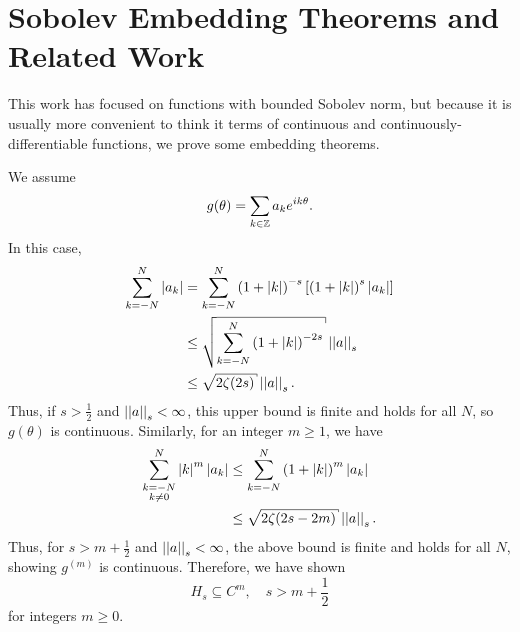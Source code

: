 \section{Sobolev Embedding Theorems and Related Work}
\label{sec:cvip_sobolev}

This work has focused on functions with bounded
Sobolev norm, but because it is usually more convenient
to think it terms of continuous
and continuously-differentiable functions, we prove some embedding theorems.

We assume
%
\begin{equation}
    g(\theta) = \sum_{k\in\mathbb{Z}} a_{k}e^{ik\theta}.
\end{equation}
%
In this case,
%
\begin{align}
    \sum_{k=-N}^{N} \abs{a_{k}}
        &= \sum_{k=-N}^{N} \parens{1+\abs{k}}^{-s}
            \brackets{\parens{1+\abs{k}}^{s}\abs{a_{k}}} \nonumber\\
    &\le \sqrt{\sum_{k=-N}^{N}\parens{1+\abs{k}}^{-2s}} \norm{a}_{s} \nonumber\\
    &\le \sqrt{2\zeta(2s)}\norm{a}_{s}.
\end{align}
%
Thus, if $s>\frac{1}{2}$ and $\left| \left| a \right| \right|_{s}<\infty$, this upper bound
is finite and holds for all $N$, so $g(\theta)$ is continuous.
Similarly, for an integer $m\ge1$, we have
%
\begin{align}
    \sum_{\substack{k=-N\\k\ne0}}^{N} \abs{k}^{m}\abs{a_{k}}
        &\le \sum_{k=-N}^{N}\parens{1+\abs{k}}^{m}\abs{a_{k}} \nonumber\\
    &\le \sqrt{2\zeta(2s-2m)}\norm{a}_{s}.
\end{align}
%
Thus, for $s>m+\frac{1}{2}$ and $\left| \left| a \right| \right|_{s}<\infty$, the above bound
is finite and holds for all $N$, showing $g^{(m)}$ is continuous.
Therefore, we have shown
%
\begin{equation}
    H_{s} \subseteq C^{m},\quad s>m+\frac{1}{2}
\end{equation}
%
for integers $m\ge0$.

